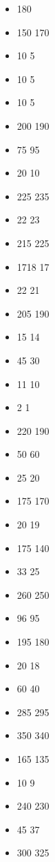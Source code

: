\begin{itemize}
	\item \cultleader{} 180 
	\item \cultleader{} \wizardmaster{} 150 \costup{} 170
	\item \cultleader{} \fallenheroes{} 10 \costdown{} 5
	\item \cultleader{} \thedishonoured{} 10 \costdown{} 5
	\item \cultleader{} \waywardchildren{} 10 \costdown{} 5
	\item \daemonsymbiote{} 200 \costdown{} 190
	\item \daemonsymbiote{} \wizardadept{} 75 \costup{} 95
	\item \daemonsymbiote{} \waywardchildren{} 20 \costdown{} 10
	\item \lemures{} 225 \costup{} 235 
	\item \lemures{} \extramodel{} 22 \costdown{} 23
	\item \succubi{} 215 \costup{} 225
	\item \succubi{} \extramodel{} 1718 \costdown{} 17
	\item \myrmidons{} \extramodel{} 22 \costdown{} 21
	\item \imps{} 205 \costdown{} 190
	\item \imps{} \extramodel{} 15 \costdown{} 14
	\item \profaneidol{} \doomsdaycolossus{} 45 \costdown{} 30
	\item \possessed{} \extramodel{} 11 \costdown{} 10
	\item \possessed{}  \fallenheroes{} 2 \costdown{} 1
	\item \ritualaltar{} 220 \costdown{} 190
	\item \ritualaltar{} \grandcouncil{} 50 \costup{} 60
	\item \threshingengine{} \fly{} 25 \costdown{} 20
	\item \hellhounds{} 175 \costdown{} 170
	\item \hellhounds{} \extramodel{} 20 \costdown{} 19
	\item \mageblightgremlins{} 175 \costdown{} 140
	\item \mageblightgremlins{} \extramodel{} 33 \costdown{} 25
	\item \clawedfiends{} 260 \costdown{} 250
	\item \clawedfiends{} \extramodel{} 96 \costdown{} 95
	\item \sirens{} 195 \costdown{} 180
	\item \sirens{} \extramodel{} 20 \costdown{} 18
	\item \blazingglory{} \fly{} 60 \costdown{} 40
	\item \hopeharvester{} 285 \costup{} 295
	\item \brazenbeasts{} 350 \costdown{} 340
	\item \furies{} 165 \costdown{} 135
	\item \furies{} \extramodel{} 10 \costdown{} 9
	\item \veilserpents{} 240 \costdown{} 230
	\item \veilserpents{} \extramodel{} 45 \costdown{} 37
	\item \bloatflies{} 300 \costup{} 325
\end{itemize}